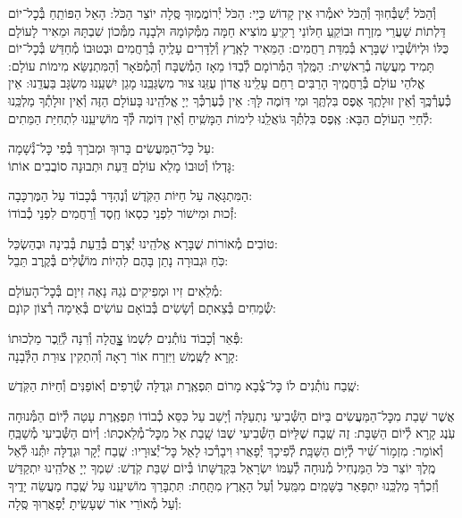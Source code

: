 \documentclass[twoside, openany, parskip=half, 11pt]{book}
\begin{document}
וְ֯הַכֹּל יְ֯שַׁבְּ֯חֽוּךָ וְ֯הַכֹּל יֹאמְ֯רוּ אֵין קָדוֹשׁ כַּיָי: הַכֹּל יְ֯רוֹמֲמֽוּךָ סֶּֽלָה יוֹצֵר הַכֹּל: הָאֵל הַפּוֹתֵֽחַ בְּ֯כׇל־יוֹם דַּלְתוֹת שַׁעֲרֵי מִזְרָח
וּבוֹקֵֽעַ חַלּוֹנֵי רָקִֽיעַ מוֹצִיא חַמָּה מִמְּ֯קוֹמָהּ וּלְבָנָה מִמְּ֯כוֹן שִׁבְתָּהּ
וּמֵאִיר לָעוֹלָם כֻּלּוֹ וּלְיוֹשְׁ֯בָיו שֶׁבָּרָא בְּ֯מִדַּת רַחֲמִים: הַמֵּאִיר לָאָֽרֶץ וְ֯לַדָּרִים עָלֶֽיהָ בְּ֯רַחֲמִים וּבְטוּבוֹ מְ֯חַדֵּשׁ בְּ֯כׇל־יוֹם תָּמִיד מַעֲשֵׂה בְ֯רֵאשִׁית:
הַמֶּֽלֶךְ הַמְּ֯רוֹמָם לְ֯בַדּוֹ מֵאָז הַמְ֯שֻׁבָּח וְ֯הַמְ֯פֹאָר וְ֯הַמִּתְנַשֵּׂא מִימוֹת עוֹלָם: אֱלֹהֵי עוֹלָם בְּ֯רַחֲמֶֽיךָ הָרַבִּים רַחֵם עָלֵֽינוּ אֲדוֹן עֻזֵּֽנוּ צוּר מִשְׂגַּבֵּֽנוּ מָגֵן יִשְׁעֵֽנוּ מִשְׂגָּב בַּעֲדֵֽנוּ:
אֵין כְּ֯עֶרְ֯כֶּֽךָ וְ֯אֵין זוּלָתֶֽךָ אֶפֶס בִּלְתֶּֽךָ וּמִי דּֽוֹמֶה לָּךְ:
אֵין כְּ֯עֶרְכְּ֯ךָ יְיָ אֱלֹהֵֽינוּ בָּעוֹלָם הַזֶּה וְ֯אֵין זוּלָתְ֯ךָ מַלְכֵּֽנוּ לְ֯חַיֵּי הָעוֹלָם הַבָּא:
אֶֽפֶס בִּלְתְּ֯ךָ גּוֹאֲלֵֽנוּ לִימוֹת הַמָּשִֽׁיחַ וְ֯אֵין דּֽוֹמֶה לְּ֯ךָ מוֹשִׁיעֵֽנוּ לִתְחִיַּת הַמֵּתִים:

עַל כׇּל־הַמַּעֲשִׂים \hfill בָּרוּךְ וּמְבֹרָךְ בְּ֯פִי כׇּל־נְ֯שָׁמָה: \\
גׇּדְלוֹ וְ֯טוּבוֹ מָלֵא עוֹלָם \hfill דַּֽעַת וּתְבוּנָה סוֹבֲבִים אוֹתוֹ:

הַמִּתְגָּאֶה עַל חַיּוֹת הַקֹּֽדֶשׁ \hfill וְ֯נֶהְדָּר בְּ֯כָבוֹד עַל הַמֶּרְכָּבָה:\\
זְ֯כוּת וּמִישׁוֹר לִפְנֵי כִסְאוֹ \hfill חֶֽסֶד וְ֯רַחֲמִים לִפְנֵי כְ֯בוֹדוֹ:

טוֹבִים מְ֯אוֹרוֹת שֶׁבָּרָא אֱלֹהֵֽינוּ \hfill יְ֯צָרָם בְּ֯דַֽעַת בְּ֯בִינָה וּבְהַשְׂכֵּל:\\
כֹּֽחַ וּגְבוּרָה נָתַן בָּהֶם \hfill לִהְיוֹת מוֹשְׁ֯לִים בְּ֯קֶֽרֶב תֵּבֵל:

מְ֯לֵאִים זִיו וּמְפִיקִים נֹֽגַהּ \hfill נָאֶה זִיוָם בְּ֯כׇל־הָעוֹלָם: \\
שְׂ֯מֵחִים בְּ֯צֵאתָם וְ֯שָׂשִׂים בְּ֯בוֹאָם \hfill עוֹשִׂים בְּ֯אֵימָה רְ֯צוֹן קוׂנָם:

פְּ֯אֵר וְ֯כָבוֹד נוֹתְ֯נִים לִשְׁמוֹ \hfill צׇׇׇׇׇהֳלָה וְ֯רִנָּה לְ֯זֵֽכֶר מַלְכוּתוֹ: \\
קָרָא לַשֶּֽׁמֶשׁ וַיִּזְרַח אוֹר \hfill רָאָה וְ֯הִתְקִין צוּרַת הַלְּ֯בָנָה:

שֶֽׁבַח נוֹתְ֯נִים לוֹ כׇּל־צְ֯בָא מָרוֹם \hfill תִּפְאֶֽרֶת וּגְדֻלָּה שְׂ֯רָפִים וְ֯אוֹפַנִּים וְ֯חַיּוֹת הַקֹּֽדֶשׁ:

אֲשֶׁר שָׁבַת מִכׇּל־הַמַּעֲשִׂים בַּיּוֹם הַשְּׁ֯בִיעִי נִתְעַלָּה וְ֯יָשַׁב עַל כִּסֵּא כְ֯בוֹדוֹ תִּפְאֶֽרֶת עָטָה לְ֯יוֹם הַמְּ֯נוּחָה עֹֽנֶג קָרָא לְ֯יוֹם הַשַּׁבָּת: זֶה שֶֽׁבַח שֶׁלַּיּוֹם הַשְּׁ֯בִיעִי שֶׁבּוֹ שָֽׁבַת אֵל מִכׇּל־מְ֯לַאכְתּוֹ: וְ֯יוֹם הַשְּׁ֯בִיעִי מְ֯שַׁבֵּֽחַ וְ֯אוֹמֵר:
%
מִזְמ֥וֹר שִׁ֝֗יר לְ֯י֥וֹם הַשַּׁבָּֽת׃ לְ֯פִיכָךְ יְ֯פָאֲרוּ וִיבָרְ֯כוּ לָאֵל כׇּל־יְ֯צוּרָיו: שֶֽׁבַח יְ֯קָר וּגְדֻלָּה יִתְּ֯נוּ לְ֯אֵל מֶֽלֶךְ יוֹצֵר כֹּל הַמַּנְחִיל מְ֯נוּחָה לְ֯עַמּוֹ יִשְׂרָאֵל בִּקְדֻשָּׁתוֹ בְּ֯יוֹם שַׁבַּת קֹֽדֶשׁ: שִׁמְךָ יְיָ אֱלֹהֵֽינוּ יִתְקַדַּשׁ וְ֯זִכְרְ֯ךָ מַלְכֵּֽנוּ יִתְפָּאַר בַּשָּׁמַֽיִם מִמַּֽעַל וְ֯עַל הָאָֽרֶץ מִתָּֽחַת: תִּתְבָּרַךְ מוֹשִׁיעֵֽנוּ עַל שֶֽׁבַח מַעֲשֵׂה יָדֶֽיךָ וְ֯עַל מְ֯אוֹרֵי אוֹר שֶׁעָשִֽׂיתָ יְ֯פָאֲרֽוּךָ סֶּֽלָה:
\end{document}

